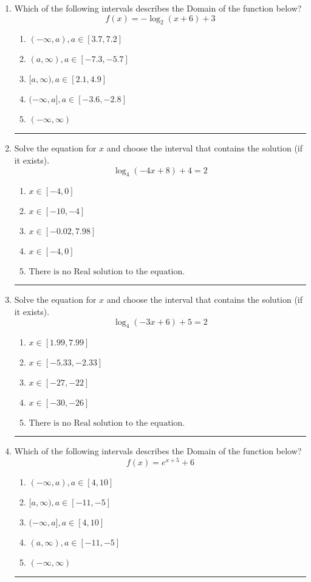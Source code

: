 \documentclass[14pt]{extbook}
\newcommand{\litem}[1]{\item#1\hspace*{-1cm}\rule{\textwidth}{0.4pt}}
\begin{document}
\begin{enumerate}
\litem{
Which of the following intervals describes the Domain of the function below?\[ f(x) = -\log_2{(x+6)}+3 \]\begin{enumerate}[label=\Alph*.]
\item \( (-\infty, a), a \in [3.7, 7.2] \)
\item \( (a, \infty), a \in [-7.3, -5.7] \)
\item \( [a, \infty), a \in [2.1, 4.9] \)
\item \( (-\infty, a], a \in [-3.6, -2.8] \)
\item \( (-\infty, \infty) \)

\end{enumerate} }
\litem{
Solve the equation for $x$ and choose the interval that contains the solution (if it exists).\[ \log_{4}{(-4x+8)}+4 = 2 \]\begin{enumerate}[label=\Alph*.]
\item \( x \in [-4, 0] \)
\item \( x \in [-10, -4] \)
\item \( x \in [-0.02, 7.98] \)
\item \( x \in [-4, 0] \)
\item \( \text{There is no Real solution to the equation.} \)

\end{enumerate} }
\litem{
Solve the equation for $x$ and choose the interval that contains the solution (if it exists).\[ \log_{4}{(-3x+6)}+5 = 2 \]\begin{enumerate}[label=\Alph*.]
\item \( x \in [1.99, 7.99] \)
\item \( x \in [-5.33, -2.33] \)
\item \( x \in [-27, -22] \)
\item \( x \in [-30, -26] \)
\item \( \text{There is no Real solution to the equation.} \)

\end{enumerate} }
\litem{
Which of the following intervals describes the Domain of the function below?\[ f(x) = e^{x+5}+6 \]\begin{enumerate}[label=\Alph*.]
\item \( (-\infty, a), a \in [4, 10] \)
\item \( [a, \infty), a \in [-11, -5] \)
\item \( (-\infty, a], a \in [4, 10] \)
\item \( (a, \infty), a \in [-11, -5] \)
\item \( (-\infty, \infty) \)


\end{enumerate}}
\end{enumerate}
\end{document}
